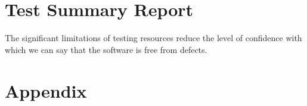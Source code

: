 \documentclass[11pt]{article}
\begin{document}
\section{Test Summary Report}%

The significant limitations of testing resources reduce the level of confidence with which we can say that the software is free from defects.


\newpage
\raggedright
{}

\newpage
\section{Appendix}

\end{document}
